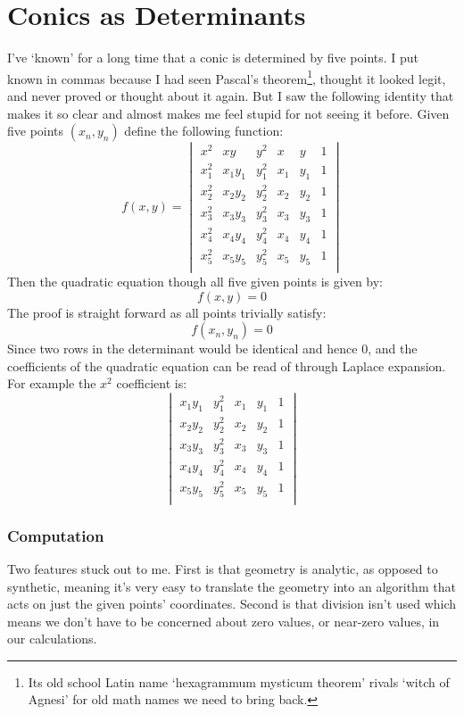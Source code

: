 
\section{Conics as Determinants}
I've `known' for a long time that a conic is determined by five points.
I put known in commas because I had seen Pascal's theorem\footnote{Its old school Latin name `hexagrammum mysticum theorem' rivals `witch of Agnesi' for old math names we need to bring back.},
thought it looked legit,
and never proved or thought about it again.
But I saw the following identity that makes it so clear and almost makes me feel stupid for not seeing it before.
Given five points $(x_n,y_n)$ define the following function:
\[
f(x,y) = \begin{vmatrix}
	x^2&xy&y^2&x&y&1\\
	x_1^2&x_1y_1&y_1^2&x_1&y_1&1\\
	x_2^2&x_2y_2&y_2^2&x_2&y_2&1\\
	x_3^2&x_3y_3&y_3^2&x_3&y_3&1\\
	x_4^2&x_4y_4&y_4^2&x_4&y_4&1\\
	x_5^2&x_5y_5&y_5^2&x_5&y_5&1\\
	\end{vmatrix}
\]
Then the quadratic equation though all five given points is given by:
\[f(x,y)=0\]
The proof is straight forward as all points trivially satisfy:
\[f(x_n,y_n)=0\]
Since two rows in the determinant would be identical and hence $0$,
and the coefficients of the quadratic equation can be read of through Laplace expansion.
For example the $x^2$ coefficient is:
\[
\begin{vmatrix}
	x_1y_1&y_1^2&x_1&y_1&1\\
	x_2y_2&y_2^2&x_2&y_2&1\\
	x_3y_3&y_3^2&x_3&y_3&1\\
	x_4y_4&y_4^2&x_4&y_4&1\\
	x_5y_5&y_5^2&x_5&y_5&1\\
\end{vmatrix}
\]

\subsubsection{Computation}
Two features stuck out to me.
First is that geometry is analytic,
as opposed to synthetic,
meaning it's very easy to translate the geometry into an algorithm that acts on just the given points' coordinates. 
Second is that division isn't used which means we don't have to be concerned about zero values,
or near-zero values,
in our calculations.
\\

